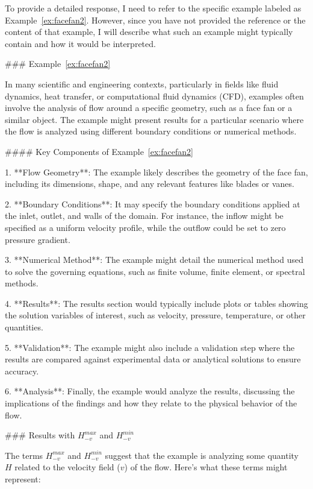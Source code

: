To provide a detailed response, I need to refer to the specific example labeled as Example~\ref{ex:facefan2}. However, since you have not provided the reference or the content of that example, I will describe what such an example might typically contain and how it would be interpreted.

### Example~\ref{ex:facefan2}

In many scientific and engineering contexts, particularly in fields like fluid dynamics, heat transfer, or computational fluid dynamics (CFD), examples often involve the analysis of flow around a specific geometry, such as a face fan or a similar object. The example might present results for a particular scenario where the flow is analyzed using different boundary conditions or numerical methods.

#### Key Components of Example~\ref{ex:facefan2}

1. **Flow Geometry**: The example likely describes the geometry of the face fan, including its dimensions, shape, and any relevant features like blades or vanes.
   
2. **Boundary Conditions**: It may specify the boundary conditions applied at the inlet, outlet, and walls of the domain. For instance, the inflow might be specified as a uniform velocity profile, while the outflow could be set to zero pressure gradient.

3. **Numerical Method**: The example might detail the numerical method used to solve the governing equations, such as finite volume, finite element, or spectral methods.

4. **Results**: The results section would typically include plots or tables showing the solution variables of interest, such as velocity, pressure, temperature, or other quantities.

5. **Validation**: The example might also include a validation step where the results are compared against experimental data or analytical solutions to ensure accuracy.

6. **Analysis**: Finally, the example would analyze the results, discussing the implications of the findings and how they relate to the physical behavior of the flow.

### Results with \( H_{-v}^{max} \) and \( H_{-v}^{min} \)

The terms \( H_{-v}^{max} \) and \( H_{-v}^{min} \) suggest that the example is analyzing some quantity \( H \) related to the velocity field (\( v \)) of the flow. Here's what these terms might represent:

